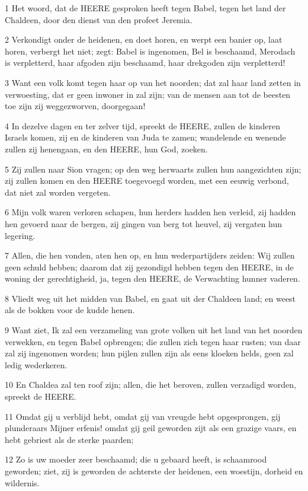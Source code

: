 \par 1 Het woord, dat de HEERE gesproken heeft tegen Babel, tegen het land der Chaldeen, door den dienst van den profeet Jeremia.
\par 2 Verkondigt onder de heidenen, en doet horen, en werpt een banier op, laat horen, verbergt het niet; zegt: Babel is ingenomen, Bel is beschaamd, Merodach is verpletterd, haar afgoden zijn beschaamd, haar drekgoden zijn verpletterd!
\par 3 Want een volk komt tegen haar op van het noorden; dat zal haar land zetten in verwoesting, dat er geen inwoner in zal zijn; van de mensen aan tot de beesten toe zijn zij weggezworven, doorgegaan!
\par 4 In dezelve dagen en ter zelver tijd, spreekt de HEERE, zullen de kinderen Israels komen, zij en de kinderen van Juda te zamen; wandelende en wenende zullen zij henengaan, en den HEERE, hun God, zoeken.
\par 5 Zij zullen naar Sion vragen; op den weg herwaarts zullen hun aangezichten zijn; zij zullen komen en den HEERE toegevoegd worden, met een eeuwig verbond, dat niet zal worden vergeten.
\par 6 Mijn volk waren verloren schapen, hun herders hadden hen verleid, zij hadden hen gevoerd naar de bergen, zij gingen van berg tot heuvel, zij vergaten hun legering.
\par 7 Allen, die hen vonden, aten hen op, en hun wederpartijders zeiden: Wij zullen geen schuld hebben; daarom dat zij gezondigd hebben tegen den HEERE, in de woning der gerechtigheid, ja, tegen den HEERE, de Verwachting hunner vaderen.
\par 8 Vliedt weg uit het midden van Babel, en gaat uit der Chaldeen land; en weest als de bokken voor de kudde henen.
\par 9 Want ziet, Ik zal een verzameling van grote volken uit het land van het noorden verwekken, en tegen Babel opbrengen; die zullen zich tegen haar rusten; van daar zal zij ingenomen worden; hun pijlen zullen zijn als eens kloeken helds, geen zal ledig wederkeren.
\par 10 En Chaldea zal ten roof zijn; allen, die het beroven, zullen verzadigd worden, spreekt de HEERE.
\par 11 Omdat gij u verblijd hebt, omdat gij van vreugde hebt opgesprongen, gij plunderaars Mijner erfenis! omdat gij geil geworden zijt als een grazige vaars, en hebt gebriest als de sterke paarden;
\par 12 Zo is uw moeder zeer beschaamd; die u gebaard heeft, is schaamrood geworden; ziet, zij is geworden de achterste der heidenen, een woestijn, dorheid en wildernis.
